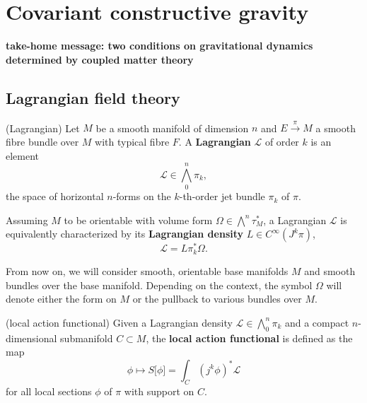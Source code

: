 \chapter{Covariant constructive gravity}

\textbf{take-home message: two conditions on gravitational dynamics determined by coupled matter theory}

\section{Lagrangian field theory}

\begin{definition}{(Lagrangian)}
  Let $M$ be a smooth manifold of dimension $n$ and $E \overset{\pi}{\longrightarrow} M$ a smooth fibre bundle over $M$ with typical fibre $F$. A \textbf{Lagrangian} $\mathcal L$ of order $k$ is an element
  \begin{equation}
    \mathcal L \in \textstyle\bigwedge^n_0\pi_k,
  \end{equation}
the space of horizontal $n$-forms on the $k$-th-order jet bundle $\pi_k$ of $\pi$.

  Assuming $M$ to be orientable with volume form $\Omega\in\bigwedge^n\tau_M^\ast$, a Lagrangian $\mathcal L$ is equivalently characterized by its \textbf{Lagrangian density} $L\in C^\infty(J^k\pi)$,
\begin{equation}
  \mathcal L = L\pi_k^\ast\Omega.
\end{equation}
\end{definition}

From now on, we will consider smooth, orientable base manifolds $M$ and smooth bundles over the base manifold. Depending on the context, the symbol $\Omega$ will denote either the form on $M$ or the pullback to various bundles over $M$.

\begin{definition}{(local action functional)}
  Given a Lagrangian density $\mathcal L \in \bigwedge^n_0\pi_k$ and a compact $n$-dimensional submanifold $C \subset M$, the \textbf{local action functional} is defined as the map
  \begin{equation}
    \phi \mapsto S\lbrack\phi\rbrack = \int_C (j^k\phi)^\ast\mathcal L
  \end{equation}
for all local sections $\phi$ of $\pi$ with support on $C$.
\end{definition}

